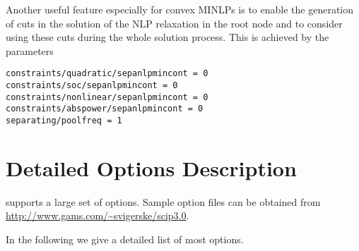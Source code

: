Another useful feature especially for convex MINLPs is to enable the generation of cuts in the solution of the NLP relaxation in the root node and to consider using these cuts during the whole solution process. This is achieved by the parameters
\begin{verbatim}
constraints/quadratic/sepanlpmincont = 0
constraints/soc/sepanlpmincont = 0
constraints/nonlinear/sepanlpmincont = 0
constraints/abspower/sepanlpmincont = 0
separating/poolfreq = 1
\end{verbatim}


\section{Detailed Options Description}

\SCIP supports a large set of options.
Sample option files can be obtained from \\ \url{http://www.gams.com/~svigerske/scip3.0}.


In the following we give a detailed list of most \SCIP options.



